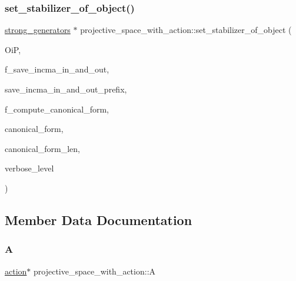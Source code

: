 \subsubsection{\texorpdfstring{set\+\_\+stabilizer\+\_\+of\+\_\+object()}{set\_stabilizer\_of\_object()}}
{\footnotesize\ttfamily \mbox{\hyperlink{classstrong__generators}{strong\+\_\+generators}} $\ast$ projective\+\_\+space\+\_\+with\+\_\+action\+::set\+\_\+stabilizer\+\_\+of\+\_\+object (\begin{DoxyParamCaption}\item[{\mbox{\hyperlink{classobject__in__projective__space}{object\+\_\+in\+\_\+projective\+\_\+space}} $\ast$}]{OiP,  }\item[{\mbox{\hyperlink{galois_8h_a09fddde158a3a20bd2dcadb609de11dc}{I\+NT}}}]{f\+\_\+save\+\_\+incma\+\_\+in\+\_\+and\+\_\+out,  }\item[{const \mbox{\hyperlink{galois_8h_ab6cc7b4aeb6ea31aba2b3fbfc83ff5e6}{B\+Y\+TE}} $\ast$}]{save\+\_\+incma\+\_\+in\+\_\+and\+\_\+out\+\_\+prefix,  }\item[{\mbox{\hyperlink{galois_8h_a09fddde158a3a20bd2dcadb609de11dc}{I\+NT}}}]{f\+\_\+compute\+\_\+canonical\+\_\+form,  }\item[{\mbox{\hyperlink{galois_8h_a122c4acf389c050379f00341fdcd5812}{U\+B\+Y\+TE}} $\ast$\&}]{canonical\+\_\+form,  }\item[{\mbox{\hyperlink{galois_8h_a09fddde158a3a20bd2dcadb609de11dc}{I\+NT}} \&}]{canonical\+\_\+form\+\_\+len,  }\item[{\mbox{\hyperlink{galois_8h_a09fddde158a3a20bd2dcadb609de11dc}{I\+NT}}}]{verbose\+\_\+level }\end{DoxyParamCaption})}



\subsection{Member Data Documentation}
\mbox{\label{classprojective__space__with__action_a43fc7fe18c196843574a7cef81cd5064}} 
\subsubsection{\texorpdfstring{A}{A}}
{\footnotesize\ttfamily \mbox{\hyperlink{classaction}{action}}$\ast$ projective\+\_\+space\+\_\+with\+\_\+action\+::A}

